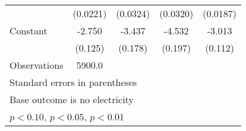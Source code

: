 \begin{table}[htbp]
\begin{tabular}{l*{4}{c}}
                    &    (0.0221)         &    (0.0324)         &    (0.0320)         &    (0.0187)         \\
\addlinespace
Constant            &      -2.750\sym{***}&      -3.437\sym{***}&      -4.532\sym{***}&      -3.013\sym{***}\\
                    &     (0.125)         &     (0.178)         &     (0.197)         &     (0.112)         \\
\midrule
Observations        &      5900.0         &                     &                     &                     \\
\bottomrule
\multicolumn{5}{l}{\footnotesize Standard errors in parentheses}\\
\multicolumn{5}{l}{\footnotesize Base outcome is no electricity}\\
\multicolumn{5}{l}{\footnotesize \sym{*} \(p<0.10\), \sym{**} \(p<0.05\), \sym{***} \(p<0.01\)}\\
\end{tabular}
\end{table}
